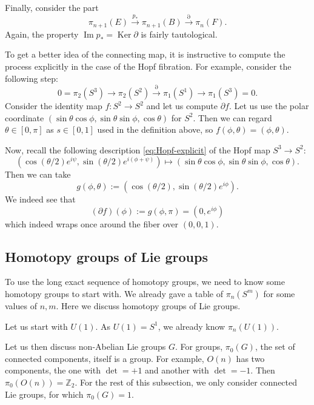 \documentclass[12pt]{article}
\numberwithin{equation}{section}
\def\bZ{\mathbb{Z}}
\def\Ker{\mathop{\mathrm{Ker}}}
\def\Im{\mathop{\mathrm{Im}}}
\begin{document}
Finally, consider the part \begin{equation}
  \pi_{n+1}(E) \stackrel{p_*}{\longrightarrow} \pi_{n+1}(B) \stackrel{\partial}{\longrightarrow} \pi_{n}(F).
\end{equation}
Again, the property $\Im p_* = \Ker \partial$ is fairly tautological.

To get a better idea of the connecting map, it is instructive 
to compute the process explicitly in the case of the Hopf fibration.
For example, consider the following step: \begin{equation}
0= \pi_2(S^3) \to \pi_2(S^2) \stackrel{\partial}{\longrightarrow} \pi_1(S^1) \to \pi_1(S^3)=0.
\end{equation}
Consider the identity map $f:S^2\to S^2$ and let us compute $\partial f$.
Let us use the polar coordinate $(\sin\theta\cos\phi,\sin\theta\sin\phi,\cos\theta)$ for $S^2$.
Then we can regard $\theta\in [0,\pi]$ as $s\in[0,1]$ used in the definition above, so $f(\phi,\theta)=(\phi,\theta)$.

Now, recall the following description \eqref{eq:Hopf-explicit} of the Hopf map $S^3\to S^2$:\begin{equation}
  (\cos(\theta/2)  e^{i \psi},
  \sin(\theta/2) e^{i(\phi+\psi)} )
  \mapsto  (\sin\theta\cos\phi,\sin\theta\sin\phi,\cos\theta).
\end{equation}
Then we can take \begin{equation}
g(\phi,\theta) := (\cos(\theta/2),\sin(\theta/2)e^{i\phi}).
\end{equation}
We indeed see that \begin{equation}
(\partial f)(\phi):= g(\phi,\pi) = (0,e^{i\phi})
\end{equation} which indeed wraps once around the fiber over $(0,0,1)$.


\subsection{Homotopy groups of Lie groups}

To use the long exact sequence of homotopy groups,
we need to know some homotopy groups to start with.
We already gave a table of $\pi_n(S^m)$ for some values of $n,m$.
Here we discuss homotopy groups of Lie groups.


Let us start with $U(1)$. As $U(1)=S^1$, we already know $\pi_n(U(1))$.

Let us then discuss non-Abelian Lie groups $G$.
For groups, $\pi_0(G)$, the set of connected components, itself is a group.
For example, $O(n)$ has two components,
the one with $\det=+1$ and another with $\det=-1$.
Then $\pi_0(O(n))=\bZ_2$. 
For the rest of this subsection, we only consider connected Lie groups,
for which $\pi_0(G)=1$.
\end{document}
